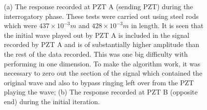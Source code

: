 \begin{figure}
\begin{subfigmatrix}{2}
\end{subfigmatrix}

  \caption[all]
  { \label{fig:initialPhaseRead}
(a) The response recorded at PZT A (sending PZT) during the interrogatory phase. These tests were carried out using steel rods which were $437 \times 10^{-3} m$ and $428 \times 10^{-3} m$ in length. It is seen that the initial wave played out by PZT A is included in the signal recorded by PZT A and is of substantially higher amplitude than the rest of the data recorded. This was one big difficulty with performing in one dimension. To make the algorithm work, it was necessary to zero out the section of the signal which contained the original wave and also to bypass ringing left over from the PZT playing the wave;
(b) The response recorded at PZT B (opposite end) during the initial iteration.
}
\end{figure}
